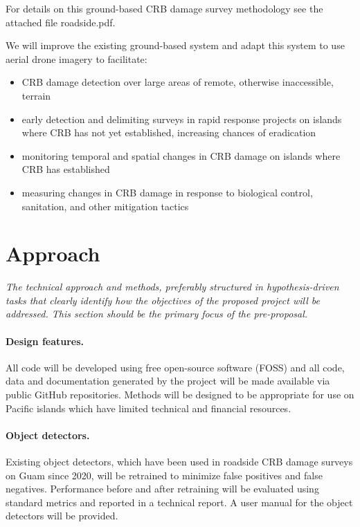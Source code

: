 \documentclass[11pt,english,letterpaper]{scrartcl}
\begin{document}
For details on this ground-based CRB damage survey methodology see the attached file roadside.pdf.

We will improve the existing ground-based system and adapt this system to use aerial drone imagery to facilitate:
\begin{itemize}
	\item CRB damage detection over large areas of remote, otherwise inaccessible, terrain
	\item early detection and delimiting surveys in rapid response projects on islands where CRB has not yet established, increasing chances of eradication
	\item monitoring temporal and spatial changes in CRB damage on islands where CRB has	established
	\item measuring changes in CRB damage in response to biological control, sanitation, and other mitigation tactics
\end{itemize}

\section{Approach}

\textit{The technical approach and methods, preferably structured in hypothesis-driven tasks that clearly identify how the objectives of the proposed project will be addressed. This section should be the primary focus of the pre-proposal.}

\paragraph{Design features.} All code will be developed using free open-source software (FOSS) and all code, data and documentation generated by the project will be made available via public GitHub repositories. Methods will be designed to be appropriate for use on Pacific islands which have  limited technical and financial resources.

\paragraph{Object detectors.} Existing object detectors, which have been used in roadside CRB damage surveys on Guam since 2020, will be retrained to minimize false positives and false negatives. Performance before and after retraining will be evaluated using standard metrics and reported in a technical report. A user manual for the object detectors will be provided. 
\end{document}
